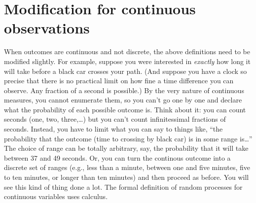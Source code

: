 \documentclass[
  openany]{book}
\begin{document}
\hypertarget{modification-for-continuous-observations}{%
\section{Modification for continuous observations}\label{modification-for-continuous-observations}}

When outcomes are continuous and not discrete, the above definitions need to be modified slightly. For example, suppose you were interested in \emph{exactly} how long it will take before a black car crosses your path. (And suppose you have a clock so precise that there is no practical limit on how fine a time difference you can observe. Any fraction of a second is possible.) By the very nature of continuous measures, you cannot enumerate them, so you can't go one by one and declare what the probability of each possible outcome is. Think about it: you can count seconds (one, two, three,\ldots) but you can't count infinitessimal fractions of seconds. Instead, you have to limit what you can say to things like, ``the probability that the outcome (time to crossing by black car) is in some range is\ldots{}'' The choice of range can be totally arbitrary, say, the probability that it will take between 37 and 49 seconds. Or, you can turn the continous outcome into a discrete set of ranges (e.g., less than a minute, between one and five minutes, five to ten minutes, or longer than ten minutes) and then proceed as before. You will see this kind of thing done a lot. The formal definition of random processes for continuous variables uses calculus.

  
\end{document}

